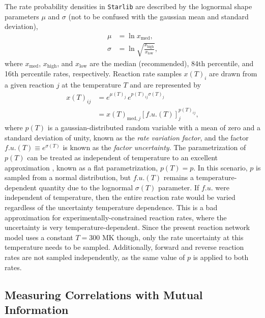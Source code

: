 The rate probability densities in \texttt{Starlib} are described by the lognormal shape parameters $\mu$ and $\sigma$ (not to be confused with the gaussian mean and standard deviation),
\begin{align} \label{eqn:lognorm_param}
\mu &= \ln x_{\mathrm{med}}, \nonumber \\
\sigma &= \ln \sqrt{\frac{x_{\mathrm{high}}}{x_{\mathrm{low}}}}, 
\end{align} 
where $x_{\mathrm{med}}$, $x_{\mathrm{high}}$, and $x_{\mathrm{low}}$ are the median (recommended), 84th percentile, and 16th percentile rates, respectively. Reaction rate samples $x(T)_{i}$ are drawn from a given reaction $j$ at the temperature $T$ and are represented by
\begin{align} \label{eqn:MC_Sampling}
x(T)_{ij} &= e^{\mu(T)_{j}} \, e^{p(T)_{ij} \sigma(T)_{j}} \nonumber \\
&= x(T)_{\mathrm{med},j}\left[ f.u.(T) \right]^{p(T)_{ij}}_{j},
\end{align}
where $p(T)$ is a gaussian-distributed random variable with a mean of zero and a standard deviation of unity, known as the \emph{rate variation factor}, and the factor $f.u.(T) \equiv e^{\sigma(T)}$ is known as the \emph{factor uncertainty}. The parametrization of $p(T)$ can be treated as independent of temperature to an excellent approximation \cite{Longland2012}, known as a flat parametrization, $p(T) = p$. In this scenario, $p$ is sampled from a normal distribution, but $f.u.(T)$ remains a temperature-dependent quantity due to the lognormal $\sigma(T)$ parameter. If $f.u.$ were independent of temperature, then the entire reaction rate would be varied regardless of the uncertainty temperature dependence. This is a bad approximation for experimentally-constrained reaction rates, where the uncertainty is very temperature-dependent. Since the present reaction network model uses a constant $T = 300$ MK though, only the rate uncertainty at this temperature needs to be sampled. Additionally, forward and reverse reaction rates are not sampled independently, as the same value of $p$ is applied to both rates.

\subsection{Measuring Correlations with Mutual Information}

